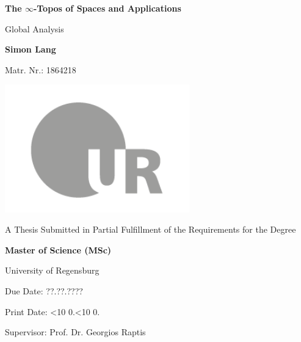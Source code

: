 \documentclass[a4paper,10pt]{scrreprt}
\newcommand{\leadingzero}[1]{\ifnum #1<10 0\the#1\else\the#1\fi}
\newcommand{\todayA}{\leadingzero{\day}.\leadingzero{\month}.\the\year}
\begin{document}
\begin{titlepage}
    \begin{center}
        \vspace*{1cm}
 
        \Huge
        \textbf{The $\infty$-Topos of Spaces and Applications}
 
        \vspace{0.5cm}
        \LARGE
        Global Analysis
 
        \vspace{1.5cm}
 
        \textbf{Simon Lang}

        \large 
        Matr. Nr.: 1864218
 		
 		\vfill
         \includegraphics[width=0.6\textwidth]{ur-logo-bildmarke-grau.png}
 
        \vfill
        \normalsize
        A Thesis Submitted in Partial Fulfillment of the Requirements for the Degree

        \LARGE
        \textbf{Master of Science (MSc)}

        \vspace{0.8cm}
 
        \Large
        University of Regensburg

        Due Date: ??.??.????

        Print Date: \todayA

        Supervisor: Prof. Dr. Georgios Raptis
 
    \end{center}
\end{titlepage}
\end{document}

